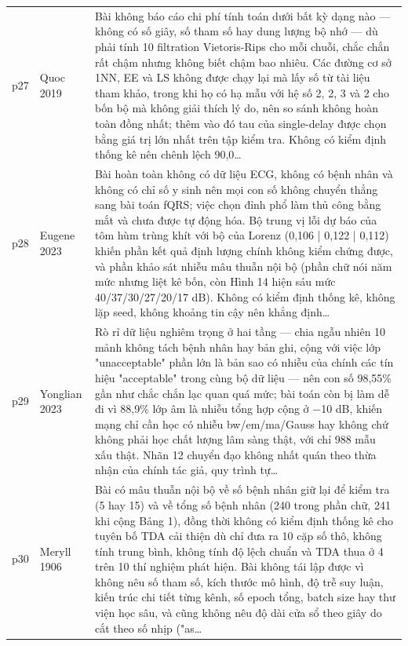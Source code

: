 \begin{longtable}{@{}L{1.05cm} L{3.2cm} L{10.1cm}@{}}
p27 & {\scriptsize Quoc 2019} & {\scriptsize Bài không báo cáo chi phí tính toán dưới bất kỳ dạng nào — không có số giây, số tham số hay dung lượng bộ nhớ — dù phải tính 10 filtration Vietoris-Rips cho mỗi chuỗi, chắc chắn rất chậm nhưng không biết chậm bao nhiêu. Các đường cơ sở 1NN, EE và LS không được chạy lại mà lấy số từ tài liệu tham khảo, trong khi họ có hạ mẫu với hệ số 2, 2, 3 và 2 cho bốn bộ mà không giải thích lý do, nên so sánh không hoàn toàn đồng nhất; thêm vào đó tau của single-delay được chọn bằng giá trị lớn nhất trên tập kiểm tra. Không có kiểm định thống kê nên chênh lệch 90,0…} \\[2pt]
p28 & {\scriptsize Eugene 2023} & {\scriptsize Bài hoàn toàn không có dữ liệu ECG, không có bệnh nhân và không có chỉ số y sinh nên mọi con số không chuyển thẳng sang bài toán fQRS; việc chọn đỉnh phổ làm thủ công bằng mắt và chưa được tự động hóa. Bộ trung vị lỗi dự báo của tôm hùm trùng khít với bộ của Lorenz (0,106 | 0,122 | 0,112) khiến phần kết quả định lượng chính không kiểm chứng được, và phần khảo sát nhiễu mâu thuẫn nội bộ (phần chữ nói năm mức nhưng liệt kê bốn, còn Hình 14 hiện sáu mức 40/37/30/27/20/17 dB). Không có kiểm định thống kê, không lặp seed, không khoảng tin cậy nên khẳng định…} \\[2pt]
p29 & {\scriptsize Yonglian 2023} & {\scriptsize Rò rỉ dữ liệu nghiêm trọng ở hai tầng — chia ngẫu nhiên 10 mảnh không tách bệnh nhân hay bản ghi, cộng với việc lớp "unacceptable" phần lớn là bản sao có nhiễu của chính các tín hiệu "acceptable" trong cùng bộ dữ liệu — nên con số 98,55\% gần như chắc chắn lạc quan quá mức; bài toán còn bị làm dễ đi vì 88,9\% lớp âm là nhiễu tổng hợp cộng ở −10 dB, khiến mạng chỉ cần học có nhiễu bw/em/ma/Gauss hay không chứ không phải học chất lượng lâm sàng thật, với chỉ 988 mẫu xấu thật. Nhãn 12 chuyển đạo không nhất quán theo thừa nhận của chính tác giả, quy trình tự…} \\[2pt]
p30 & {\scriptsize Meryll 1906} & {\scriptsize Bài có mâu thuẫn nội bộ về số bệnh nhân giữ lại để kiểm tra (5 hay 15) và về tổng số bệnh nhân (240 trong phần chữ, 241 khi cộng Bảng 1), đồng thời không có kiểm định thống kê cho tuyên bố TDA cải thiện dù chỉ đưa ra 10 cặp số thô, không tính trung bình, không tính độ lệch chuẩn và TDA thua ở 4 trên 10 thí nghiệm phát hiện. Bài không tái lập được vì không nêu số tham số, kích thước mô hình, độ trễ suy luận, kiến trúc chi tiết từng kênh, số epoch tổng, batch size hay thư viện học sâu, và cũng không nêu độ dài cửa sổ theo giây do cắt theo số nhịp ("as…} \\[2pt]

\end{longtable}
